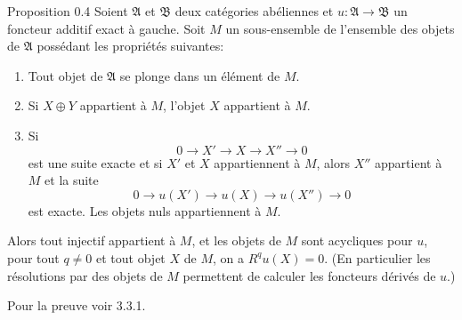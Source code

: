 \documentclass[10pt]{../fichiers-configuration-latex/smfart}
\begin{document}
\begin{enonce*}{Proposition 0.4}
Soient $\mathfrak{A}$ et $\mathfrak{B}$ deux catégories abéliennes
et $u : \mathfrak{A} \rightarrow \mathfrak{B}$ un foncteur %
additif exact à gauche. Soit $M$ un sous-ensemble de l'ensemble des objets
de $\mathfrak{A}$ possédant les propriétés suivantes:
\begin{enumerate}
\renewcommand{\labelenumi}{\theenumi)}
\item Tout objet de $\mathfrak{A}$ se plonge dans un élément de
  $M$.

\item Si $X \oplus Y$ appartient à $M$, l'objet $X$ appartient à
  $M$.

\item Si
$$
0 \longrightarrow X' \longrightarrow X \longrightarrow X''
\longrightarrow 0
$$
est une suite exacte et si $X'$ et $X$ appartiennent à $M$, alors
$X''$ appartient à $M$ et la suite
$$
0 \longrightarrow u(X') \longrightarrow u(X) \longrightarrow u(X'')
\longrightarrow 0
$$
est exacte. Les objets nuls appartiennent à $M$.
\end{enumerate}

Alors tout injectif appartient à $M$, et les objets de $M$ sont
acycliques pour $u$, \ie pour tout $q \neq 0$ et tout objet $X$ de
$M$, on a $R^q u(X) = 0$. (En particulier les résolutions par des
objets de $M$ permettent de calculer les foncteurs dérivés de $u$.)
\end{enonce*}

Pour la preuve\sisi{}{,} voir \cite{SGA4-05:11} 3.3.1.
\end{document}

